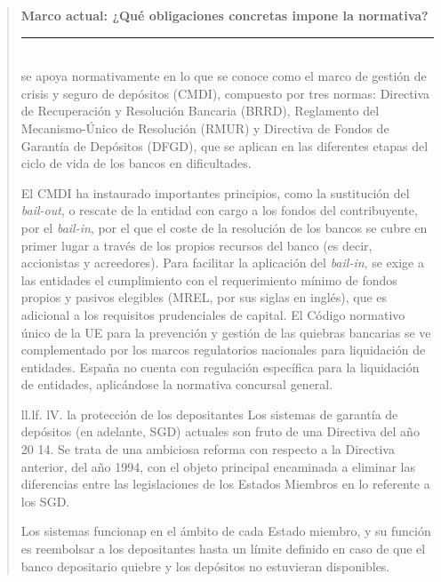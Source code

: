 \documentclass[10pt,a4paper]{article}
\newenvironment{specialblock}[1]{%
      \begin{quote} %
      \small %
      \noindent\textbf{#1}\\[-0.3em] %
      \rule{\linewidth}{0.4pt}\\[0.6em]}{
      \end{quote}}
\begin{document}
\begin{specialblock}{Marco actual: ¿Qué obligaciones concretas impone la normativa?}
    se apoya normativamente en lo que se conoce como el marco de gestión de crisis y seguro de depósitos (CMDI), compuesto por tres normas: Directiva de Recuperación y Resolución Bancaria (BRRD), Reglamento del Mecanismo-Único de Resolución (RMUR) y Directiva de Fondos de Garantía de Depósitos (DFGD), que se aplican en las diferentes etapas del ciclo de vida de los bancos en dificultades. 
    
    El CMDI ha instaurado importantes principios, como la sustitución del \textit{bail-out}, o rescate de la entidad con cargo a los fondos del contribuyente, por el \textit{bail-in}, por el que el coste de la resolución de los bancos se cubre en primer lugar a través de los propios recursos del banco (es decir, accionistas y acreedores). Para facilitar la aplicación del \textit{bail-in}, se exige a las entidades el cumplimiento con el requerimiento mínimo de fondos propios y pasivos elegibles (MREL, por sus siglas en inglés), que es adicional a los requisitos prudenciales de capital. El Código normativo único de la UE para la prevención y gestión de las quiebras bancarias se ve complementado por los marcos regulatorios nacionales para liquidación de entidades. España no cuenta con regulación específica para la liquidación de entidades, aplicándose la normativa concursal general.
    
    ll.lf. lV. la protección de los depositantes
    Los sistemas de garantía de depósitos (en adelante, SGD) actuales son fruto de una Directiva del año 20 14. Se trata de una ambiciosa reforma con respecto a la Directiva anterior, del año 1994, con el objeto principal encaminada a eliminar las diferencias entre las legislaciones de los Estados Miembros en lo referente a los SGD.
    
    Los sistemas funcionap en el ámbito de cada Estado miembro, y su función es reembolsar a los depositantes hasta un límite definido en caso de que el banco depositario quiebre y los depósitos no estuvieran disponibles.
    

\end{specialblock}
\end{document}
